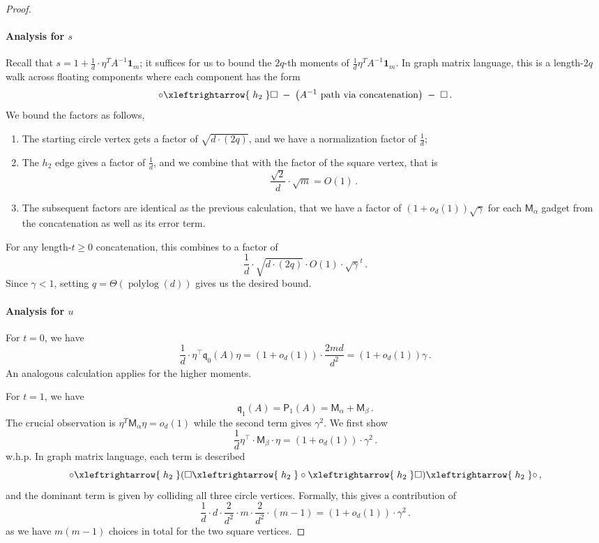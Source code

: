 \documentclass[12pt]{article}
\def \al {\alpha}
\def\1{\bm{1}}
\newcommand{\polylog}{\operatorname{polylog}}
\newcommand{\gam}{\gamma}
\newcommand{\cm}{\mathsf{M} }
\newcommand{\fp}{\mathsf{P}}
\newcommand{\q}{\mathfrak q}
\begin{document}
\begin{proof}
	 
	\paragraph{Analysis for $s$} 
	 Recall that $s = 1+ \frac{1}{d} \cdot \eta^T A^{-1} \1_m$; it suffices for us to bound the $2q$-th moments of $\frac{1}{d} \eta^T A^{-1} \1_m$. In graph matrix language, this is a length-$2q$ walk across floating components where each component has the form\[
    \circ
    \xleftrightarrow{\;h_2\;}
    \Box
    \;-\;
    \bigl(A^{-1}\text{ path via concatenation}\bigr)\;-\;\Box
        \,.
\]
We bound the factors as follows,\begin{enumerate}
	\item The starting circle vertex gets a factor of $\sqrt{d\cdot (2q) }$, and we have a normalization factor of $\frac{1}{d}$;
	\item The $h_2$ edge gives a factor of $\frac{1}{d}$, and we combine that with the factor of the square vertex, that is \[ 
	\frac{\sqrt{2} }{d} \cdot \sqrt{m} =O(1) \,. 
	\]
	\item The subsequent factors are identical as the previous calculation, that we have a factor of $(1+o_d(1))\sqrt{\gamma}$ for each $\cm_\al$ gadget from the concatenation as well as its error term.
\end{enumerate}
For any length-$t\geq 0$ concatenation, this combines to a factor of \[ 
\frac{1}{d } \cdot  \sqrt{d\cdot (2q) }  \cdot O(1) \cdot \sqrt{\gam}^t\,.
\]
Since $\gam<1$, setting $q=\Theta(\polylog(d))$ gives us the desired bound.

\paragraph{Analysis for $u$}
For $t=0$, we have \[
\frac{1}{d} \cdot \eta^\top \q_0(A) \eta  = (1+o_d(1)) \cdot \frac{2md }{d^2} = (1+o_d(1)) \gam \,.
\]
 An analogous calculation applies for the higher moments.
   	
  	For $t=1$, we have \[
  	\q_1(A) = \fp_1(A) = \cm_\al + \cm_\beta \,.
  	 \]
  	 The crucial observation is $\eta^T \cm_\al \eta = o_d(1)$  while the second term gives $\gamma^2$. We first show \[ 
  	 \frac{1}{d } \eta^\top \cdot \cm_\beta \cdot \eta =(1+o_d(1)) \cdot \gamma^2 \,. 
  	 \]  	 w.h.p.
  	 In graph matrix language, each term is described \[ 
  	 \circ \xleftrightarrow{\;h_2\;} (\Box \xleftrightarrow{\;h_2\;} \circ  \xleftrightarrow{\;h_2\;} \Box) \xleftrightarrow{\;h_2\;}\circ 
  	 \,,\] and the dominant term is given by colliding all three circle vertices. Formally, this gives a contribution of \[
  	 \frac{1}{d }\cdot d \cdot  \frac{2}{d^2}\cdot m \cdot \frac{2}{d^2}\cdot (m-1)  =  (1+o_d(1))\cdot \gam^2\,.
  	  \]
  	 as we have $m(m-1)$ choices in total for the two square vertices.
  	 

\end{proof}
\end{document}
